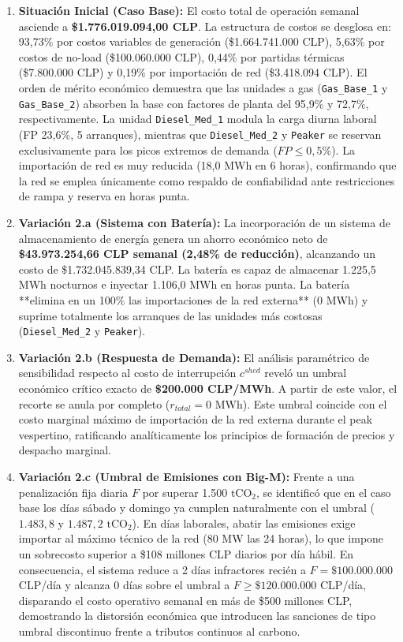 \documentclass[10pt,letterpaper]{article}
\begin{document}
\begin{enumerate}
    \item \textbf{Situación Inicial (Caso Base):} El costo total de operación semanal asciende a \textbf{\$1.776.019.094,00 CLP}. La estructura de costos se desglosa en: 93,73\% por costos variables de generación (\$1.664.741.000 CLP), 5,63\% por costos de no-load (\$100.060.000 CLP), 0,44\% por partidas térmicas (\$7.800.000 CLP) y 0,19\% por importación de red (\$3.418.094 CLP). El orden de mérito económico demuestra que las unidades a gas (\texttt{Gas\_Base\_1} y \texttt{Gas\_Base\_2}) absorben la base con factores de planta del 95,9\% y 72,7\%, respectivamente. La unidad \texttt{Diesel\_Med\_1} modula la carga diurna laboral (FP 23,6\%, 5 arranques), mientras que \texttt{Diesel\_Med\_2} y \texttt{Peaker} se reservan exclusivamente para los picos extremos de demanda ($FP \le 0,5\%$). La importación de red es muy reducida (18,0 MWh en 6 horas), confirmando que la red se emplea únicamente como respaldo de confiabilidad ante restricciones de rampa y reserva en horas punta.
    \item \textbf{Variación 2.a (Sistema con Batería):} La incorporación de un sistema de almacenamiento de energía genera un ahorro económico neto de \textbf{\$43.973.254,66 CLP semanal (2,48\% de reducción)}, alcanzando un costo de \$1.732.045.839,34 CLP. La batería es capaz de almacenar 1.225,5 MWh nocturnos e inyectar 1.106,0 MWh en horas punta. La batería **elimina en un 100\% las importaciones de la red externa** (0 MWh) y suprime totalmente los arranques de las unidades más costosas (\texttt{Diesel\_Med\_2} y \texttt{Peaker}).
    \item \textbf{Variación 2.b (Respuesta de Demanda):} El análisis paramétrico de sensibilidad respecto al costo de interrupción $c^{shed}$ reveló un umbral económico crítico exacto de \textbf{\$200.000 CLP/MWh}. A partir de este valor, el recorte se anula por completo ($r_{total} = 0$ MWh). Este umbral coincide con el costo marginal máximo de importación de la red externa durante el peak vespertino, ratificando analíticamente los principios de formación de precios y despacho marginal.
    \item \textbf{Variación 2.c (Umbral de Emisiones con Big-M):} Frente a una penalización fija diaria $F$ por superar 1.500 $\text{tCO}_2$, se identificó que en el caso base los días sábado y domingo ya cumplen naturalmente con el umbral ($1.483,8$ y $1.487,2\text{ tCO}_2$). En días laborales, abatir las emisiones exige importar al máximo técnico de la red (80 MW las 24 horas), lo que impone un sobrecosto superior a \$108 millones CLP diarios por día hábil. En consecuencia, el sistema reduce a 2 días infractores recién a $F = \$100.000.000$ CLP/día y alcanza 0 días sobre el umbral a $F \ge \$120.000.000$ CLP/día, disparando el costo operativo semanal en más de \$500 millones CLP, demostrando la distorsión económica que introducen las sanciones de tipo umbral discontinuo frente a tributos continuos al carbono.
\end{enumerate}
\end{document}
